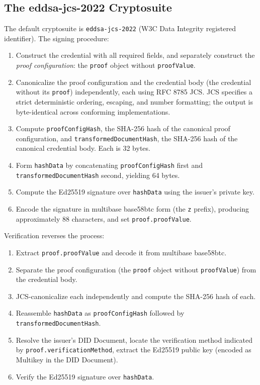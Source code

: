 \documentclass[11pt,a4paper]{article}
\begin{document}
\subsection{The eddsa-jcs-2022 Cryptosuite}

The default cryptosuite is \texttt{eddsa-jcs-2022} (W3C Data Integrity registered identifier). The signing procedure:

\begin{enumerate}[label=\arabic*.,leftmargin=*]
\item Construct the credential with all required fields, and separately construct the \emph{proof configuration}: the \verb|proof| object without \verb|proofValue|.
\item Canonicalize the proof configuration and the credential body (the credential without its \verb|proof|) independently, each using RFC 8785 JCS. JCS specifies a strict deterministic ordering, escaping, and number formatting; the output is byte-identical across conforming implementations.
\item Compute \verb|proofConfigHash|, the SHA-256 hash of the canonical proof configuration, and \verb|transformedDocumentHash|, the SHA-256 hash of the canonical credential body. Each is 32 bytes.
\item Form \verb|hashData| by concatenating \verb|proofConfigHash| first and \verb|transformedDocumentHash| second, yielding 64 bytes.
\item Compute the Ed25519 signature over \verb|hashData| using the issuer's private key.
\item Encode the signature in multibase base58btc form (the \texttt{z} prefix), producing approximately 88 characters, and set \verb|proof.proofValue|.
\end{enumerate}

Verification reverses the process:

\begin{enumerate}[label=\arabic*.,leftmargin=*]
\item Extract \verb|proof.proofValue| and decode it from multibase base58btc.
\item Separate the proof configuration (the \verb|proof| object without \verb|proofValue|) from the credential body.
\item JCS-canonicalize each independently and compute the SHA-256 hash of each.
\item Reassemble \verb|hashData| as \verb|proofConfigHash| followed by \verb|transformedDocumentHash|.
\item Resolve the issuer's DID Document, locate the verification method indicated by \verb|proof.verificationMethod|, extract the Ed25519 public key (encoded as Multikey in the DID Document).
\item Verify the Ed25519 signature over \verb|hashData|.
\end{enumerate}
\end{document}

